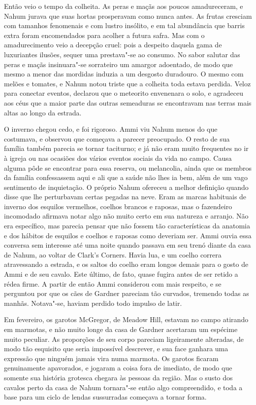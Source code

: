 Então veio o tempo da colheita. As peras e maçãs aos poucos
amadureceram, e Nahum jurava que suas hortas prosperavam como nunca
antes. As frutas cresciam com tamanhos fenomenais e com lustro insólito,
e em tal abundância que barris extra foram encomendados para acolher a
futura safra. Mas com o amadurecimento veio a decepção cruel: pois a
despeito daquela gama de luxuriantes ilusões, sequer uma prestava"-se ao
consumo. No sabor salutar das peras e maçãs insinuara"-se sorrateiro um
amargor adoentado, de modo que mesmo a menor das mordidas induzia a um
desgosto duradouro. O mesmo com melões e tomates, e Nahum notou triste
que a colheita toda estava perdida. Veloz para conectar eventos,
declarou que o meteorito envenenara o solo, e agradeceu aos céus que a
maior parte das outras semeaduras se encontravam nas terras mais altas
ao longo da estrada.

O inverno chegou cedo, e foi rigoroso. Ammi viu Nahum menos do que
costumava, e observou que começava a parecer preocupado. O resto de sua
família também parecia se tornar taciturno; e já não eram muito
frequentes no ir à igreja ou nas ocasiões dos vários eventos sociais da
vida no campo. Causa alguma pôde se encontrar para essa reserva, ou
melancolia, ainda que os membros da família confessassem aqui e ali que
a saúde não lhes ia bem, além de um vago sentimento de inquietação. O
próprio Nahum ofereceu a melhor definição quando disse que lhe
perturbavam certas pegadas na neve. Eram as marcas habituais de inverno
dos esquilos vermelhos, coelhos brancos e raposas, mas o fazendeiro
incomodado afirmava notar algo não muito certo em sua natureza e
arranjo. Não era específico, mas parecia pensar que não fossem tão
características da anatomia e dos hábitos de esquilos e coelhos e
raposas como deveriam ser. Ammi ouvia essa conversa sem interesse até
uma noite quando passava em seu trenó diante da casa de Nahum, ao voltar
de Clark's Corners. Havia lua, e um coelho correra atravessando a
estrada, e os saltos do coelho eram longos demais para o gosto de Ammi e
de seu cavalo. Este último, de fato, quase fugira antes de ser retido a
rédea firme. A partir de então Ammi considerou com mais respeito, e se
perguntou por que os cães de Gardner pareciam tão curvados, tremendo
todas as manhãs. Notava"-se, haviam perdido todo impulso de latir.

Em fevereiro, os garotos McGregor, de Meadow Hill, estavam no campo
atirando em marmotas, e não muito longe da casa de Gardner acertaram um
espécime muito peculiar. As proporções de seu corpo pareciam
ligeiramente alteradas, de modo tão esquisito que seria impossível
descrever, e sua face ganhara uma expressão que ninguém jamais vira numa
marmota. Os garotos ficaram genuinamente apavorados, e jogaram a coisa
fora de imediato, de modo que somente sua história grotesca chegara às
pessoas da região. Mas o susto dos cavalos perto da casa de Nahum
tornara"-se então algo compreendido, e toda a base para um ciclo de
lendas sussurradas começava a tornar forma.

